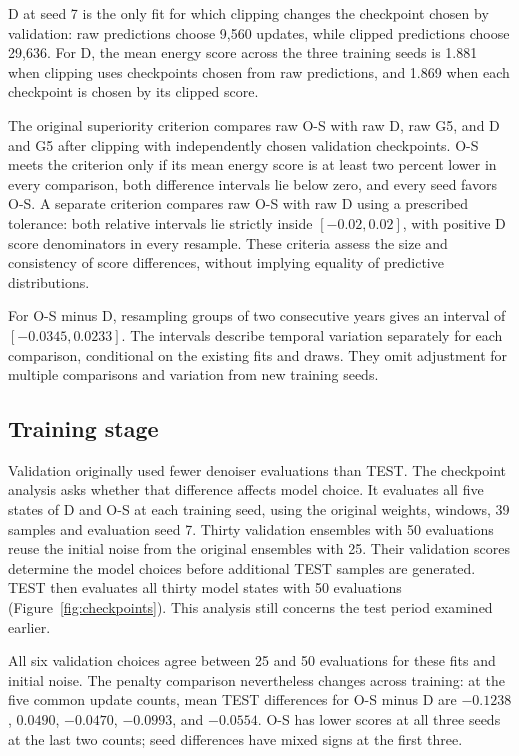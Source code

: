 \documentclass{article}
\begin{document}
D at seed 7 is the only fit for which clipping changes the checkpoint chosen by validation: raw predictions choose 9{,}560 updates, while clipped predictions choose 29{,}636. For D, the mean energy score across the three training seeds is 1.881 when clipping uses checkpoints chosen from raw predictions, and 1.869 when each checkpoint is chosen by its clipped score.

The original superiority criterion compares raw O-S with raw D, raw G5, and D and G5 after clipping with independently chosen validation checkpoints. O-S meets the criterion only if its mean energy score is at least two percent lower in every comparison, both difference intervals lie below zero, and every seed favors O-S. A separate criterion compares raw O-S with raw D using a prescribed tolerance: both relative intervals lie strictly inside $[-0.02,0.02]$, with positive D score denominators in every resample. These criteria assess the size and consistency of score differences, without implying equality of predictive distributions.

For O-S minus D, resampling groups of two consecutive years gives an interval of $[-0.0345,0.0233]$. The intervals describe temporal variation separately for each comparison, conditional on the existing fits and draws. They omit adjustment for multiple comparisons and variation from new training seeds.

\subsection{Training stage}
\label{app:checkpoints}

Validation originally used fewer denoiser evaluations than TEST. The checkpoint analysis asks whether that difference affects model choice. It evaluates all five states of D and O-S at each training seed, using the original weights, windows, 39 samples and evaluation seed 7. Thirty validation ensembles with 50 evaluations reuse the initial noise from the original ensembles with 25. Their validation scores determine the model choices before additional TEST samples are generated. TEST then evaluates all thirty model states with 50 evaluations (Figure~\ref{fig:checkpoints}). This analysis still concerns the test period examined earlier.

\begin{samepage}
All six validation choices agree between 25 and 50 evaluations for these fits and initial noise. The penalty comparison nevertheless changes across training: at the five common update counts, mean TEST differences for O-S minus D are $-0.1238$, $0.0490$, $-0.0470$, $-0.0993$, and $-0.0554$. O-S has lower scores at all three seeds at the last two counts; seed differences have mixed signs at the first three.

\end{samepage}
\end{document}
